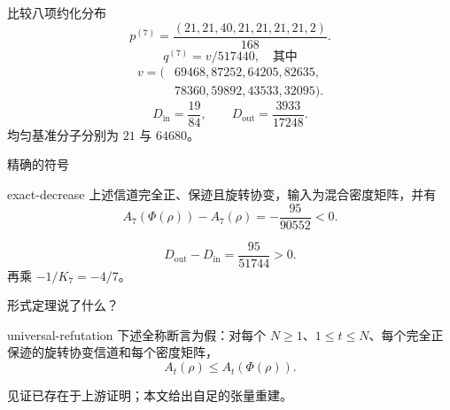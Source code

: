\documentclass{beamer}
\begin{document}
\begin{frame}{比较八项约化分布}
\small
\[p^{(7)}=\frac{(21,21,40,21,21,21,21,2)}{168}.\]
\[q^{(7)}=v/517440,\quad\text{其中}\]
\[\begin{aligned}v=(&69468,87252,64205,82635,\\&78360,59892,43533,32095).\end{aligned}\]
\normalsize
\[D_{\mathrm{in}}=\frac{19}{84},\qquad
D_{\mathrm{out}}=\frac{3933}{17248}.\]
均匀基准分子分别为 $21$ 与 $64680$。
\end{frame}
\begin{frame}{精确的符号}
\begin{bookresult}{exact-decrease}
上述信道完全正、保迹且旋转协变，输入为混合密度矩阵，并有
\[A_7(\Phi(\rho))-A_7(\rho)=-\frac{95}{90552}<0.\]
\end{bookresult}
\[D_{\mathrm{out}}-D_{\mathrm{in}}=\frac{95}{51744}>0.\]
再乘 $-1/K_7=-4/7$。
\end{frame}
\begin{frame}{形式定理说了什么？}
\begin{bookresult}{universal-refutation}
下述全称断言为假：对每个 $N\geq1$、$1\leq t\leq N$、每个完全正保迹的旋转协变信道和每个密度矩阵，
\[A_t(\rho)\leq A_t(\Phi(\rho)).\]
\end{bookresult}
\small 见证已存在于上游证明；本文给出自足的张量重建。
\end{frame}
\end{document}
